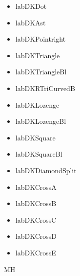 \documentclass[a4paper]{article}%
\begin{document}
\begin{itemize}[labDKDot]
\item%
    labDKDot
\end{itemize}
\begin{itemize}[labDKAst]
\item%
    labDKAst
\end{itemize}
\begin{itemize}[labDKPointright]
\item%
    labDKPointright
\end{itemize}
\begin{itemize}[labDKTriangle]
\item%
    labDKTriangle
\end{itemize}
\begin{itemize}[labDKTriangleBl]
\item%
    labDKTriangleBl
\end{itemize}
\begin{itemize}[labDKRTriCurvedB]
\item%
    labDKRTriCurvedB
\end{itemize}
\begin{itemize}[labDKLozenge]
\item%
    labDKLozenge
\end{itemize}
\begin{itemize}[labDKLozengeBl]
\item%
    labDKLozengeBl
\end{itemize}
\begin{itemize}[labDKSquare]
\item%
    labDKSquare
\end{itemize}
\begin{itemize}[labDKSquareBl]
\item%
    labDKSquareBl
\end{itemize}
\begin{itemize}[labDKDiamondSplit]
\item%
    labDKDiamondSplit
\end{itemize}
\begin{itemize}[labDKCrossA]
\item%
    labDKCrossA
\end{itemize}
\begin{itemize}[labDKCrossB]
\item%
    labDKCrossB
\end{itemize}
\begin{itemize}[labDKCrossC]
\item%
    labDKCrossC
\end{itemize}
\begin{itemize}[labDKCrossD]
\item%
    labDKCrossD
\end{itemize}
\begin{itemize}[labDKCrossE]
\item%
    labDKCrossE
\end{itemize}
MH
\end{document}
